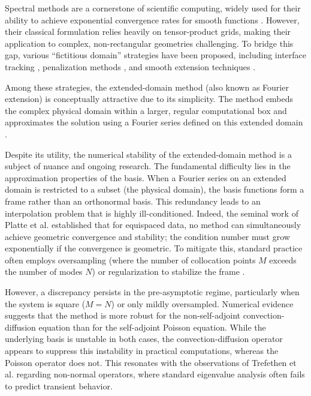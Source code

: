\documentclass[pdflatex,sn-mathphys-num]{sn-jnl}%
\theoremstyle{thmstyleone}%
\begin{document}
Spectral methods are a cornerstone of scientific computing, widely used for their ability to achieve exponential convergence rates for smooth functions \cite{boyd2001chebyshev, canuto2007spectral}. However, their classical formulation relies heavily on tensor-product grids, making their application to complex, non-rectangular geometries challenging. To bridge this gap, various ``fictitious domain'' strategies have been proposed, including interface tracking \cite{leveque1994immersed}, penalization methods \cite{angot1999penalization}, and smooth extension techniques \cite{bruno2010high, stein2016immersed}.

% 

Among these strategies, the extended-domain method (also known as Fourier extension) is conceptually attractive due to its simplicity. The method embeds the complex physical domain within a larger, regular computational box and approximates the solution using a Fourier series defined on this extended domain \cite{lui2009spectral, sabetghadam2009fourier, fang2011towards}.

Despite its utility, the numerical stability of the extended-domain method is a subject of nuance and ongoing research. The fundamental difficulty lies in the approximation properties of the basis. When a Fourier series on an extended domain is restricted to a subset (the physical domain), the basis functions form a frame rather than an orthonormal basis. This redundancy leads to an interpolation problem that is highly ill-conditioned. Indeed, the seminal work of Platte et al. \cite{platte2011impossibility} established that for equispaced data, no method can simultaneously achieve geometric convergence and stability; the condition number must grow exponentially if the convergence is geometric. To mitigate this, standard practice often employs oversampling (where the number of collocation points $M$ exceeds the number of modes $N$) or regularization to stabilize the frame \cite{huybrechs2010fourier, adcock2014numerical}.


However, a discrepancy persists in the pre-asymptotic regime, particularly when the system is square ($M=N$) or only mildly oversampled. Numerical evidence suggests that the method is more robust for the non-self-adjoint convection-diffusion equation than for the self-adjoint Poisson equation. While the underlying basis is unstable in both cases, the convection-diffusion operator appears to suppress this instability in practical computations, whereas the Poisson operator does not. This resonates with the observations of Trefethen et al. \cite{Trefethen1999} regarding non-normal operators, where standard eigenvalue analysis often fails to predict transient behavior.
\end{document}
